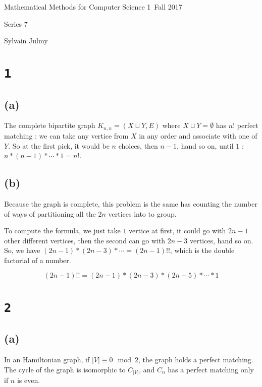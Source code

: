 \documentclass[a4paper,11pt]{report}
\author{Sylvain Julmy}
\date{\today}
\begin{document}
\begin{center}
  \Large{
    Mathematical Methods for Computer Science 1\
    Fall 2017
  }
  \noindent\makebox[\linewidth]{\rule{\linewidth}{0.4pt}}

  Series 7
  \vspace*{1.4cm}

  Sylvain Julmy
  
  \noindent\makebox[\linewidth]{\rule{\linewidth}{0.4pt}}
\end{center}

\section*{\texttt{1}}

\subsection*{(a)}

The complete bipartite graph $K_{n,n} = (X \sqcup Y, E)$ where $X \sqcup Y =
\emptyset$ has $n!$ perfect matching : we can take any vertice from $X$ in any
order and associate with one of $Y$. So at the first pick, it would be $n$
choices, then $n-1$, hand so on, until $1$ : $n * (n-1) * \cdots * 1 = n!$.

\subsection*{(b)}

Because the graph is complete, this problem is the same has counting the number
of ways of partitioning all the $2n$ vertices into to group.

To compute the formula, we just take $1$ vertice at first, it could go with
$2n-1$ other different vertices, then the second can go with $2n-3$ vertices,
hand so on. So, we have $(2n-1) * (2n-3) * \cdots = (2n-1)!!$, which is the
double factorial of a number.

\[
  (2n-1)!! = (2n-1) * (2n-3) * (2n-5) * \cdots * 1
\]

\section*{\texttt{2}}

\subsection*{(a)}
In an Hamiltonian graph, if $|V| \equiv 0 \mod 2$, the graph holds a perfect
matching. The cycle of the graph is isomorphic to $C_{|V|}$, and $C_n$ has a
perfect matching only if $n$ is even.
\end{document}
